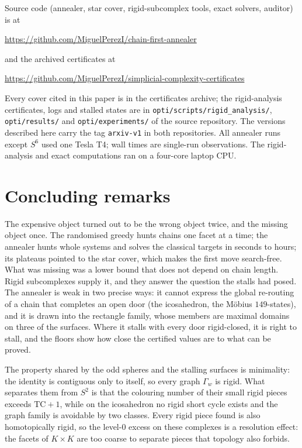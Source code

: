 \documentclass[12pt]{article}
\newcommand{\TC}{\mathrm{TC}}
\begin{document}
Source code (annealer, star cover, rigid-subcomplex tools, exact solvers,
auditor) is at
\begin{center}\url{https://github.com/MiguelPerezI/chain-first-annealer}\end{center}
and the archived certificates at
\begin{center}\url{https://github.com/MiguelPerezI/simplicial-complexity-certificates}\end{center}
Every cover cited in this paper is in the certificates archive; the
rigid-analysis certificates, logs and stalled states are in
\texttt{opti/scripts/rigid\_analysis/}, \texttt{opti/results/} and
\texttt{opti/experiments/} of the source repository.  The versions described
here carry the tag \texttt{arxiv-v1} in both repositories.
All annealer runs except $S^6$ used one Tesla T4; wall times are single-run
observations.  The rigid-analysis and exact computations ran on a four-core
laptop CPU.

\section{Concluding remarks}\label{sec:concl}

The expensive object turned out to be the wrong object twice, and the
missing object once.  The randomised greedy hunts chains one facet at a
time; the annealer hunts whole systems and solves the classical targets in
seconds to hours; its plateaus pointed to the star cover, which makes the
first move search-free.  What was missing was a lower bound that does not
depend on chain length.  Rigid subcomplexes supply it, and they answer the
question the stalls had posed.  The annealer is weak in two precise ways: it
cannot express the global re-routing of a chain that completes an open door
(the icosahedron, the M\"obius $149$-states), and it is drawn into the
rectangle family, whose members are maximal domains on three of the
surfaces.  Where it stalls with every door rigid-closed, it is right to
stall, and the floors show how close the certified values are to what can
be proved.

The property shared by the odd spheres and the stalling surfaces is
minimality: the identity is contiguous only to itself, so every graph
$\Gamma_w$ is rigid.  What separates them from $S^2$ is that the colouring
number of their small rigid pieces exceeds $\TC+1$, while on the icosahedron
no rigid short cycle exists and the graph family is avoidable by two
classes.  Every rigid piece found is also homotopically rigid, so the
level-$0$ excess on these complexes is a resolution effect: the facets of
$K\times K$ are too coarse to separate pieces that topology also forbids.
\end{document}
